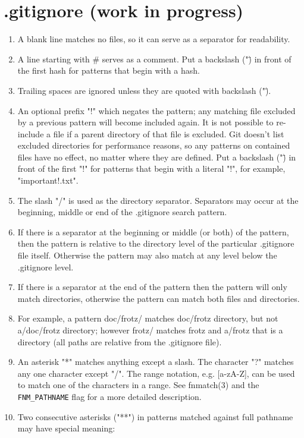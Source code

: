 \documentclass{charun}
\begin{document}
\section{.gitignore (work in progress)}
\begin{enumerate}
\item A blank line matches no files, so it can serve as a separator for readability.
\item A line starting with \# serves as a comment. Put a backslash ("\") in front of the first hash for patterns that begin with a hash.
\item Trailing spaces are ignored unless they are quoted with backslash ("\").
\item An optional prefix "!" which negates the pattern; any matching file excluded by a previous pattern will become included again. It is not possible to re-include a file if a parent directory of that file is excluded. Git doesn’t list excluded directories for performance reasons, so any patterns on contained files have no effect, no matter where they are defined. Put a backslash ("\") in front of the first "!" for patterns that begin with a literal "!", for example, "\!important!.txt".
\item The slash "/" is used as the directory separator. Separators may occur at the beginning, middle or end of the .gitignore search pattern.
\item If there is a separator at the beginning or middle (or both) of the pattern, then the pattern is relative to the directory level of the particular .gitignore file itself. Otherwise the pattern may also match at any level below the .gitignore level.
\item If there is a separator at the end of the pattern then the pattern will only match directories, otherwise the pattern can match both files and directories.
\item For example, a pattern doc/frotz/ matches doc/frotz directory, but not a/doc/frotz directory; however frotz/ matches frotz and a/frotz that is a directory (all paths are relative from the .gitignore file).
\item An asterisk "*" matches anything except a slash. The character "?" matches any one character except "/". The range notation, e.g. [a-zA-Z], can be used to match one of the characters in a range. See fnmatch(3) and the \texttt{FNM_PATHNAME} flag for a more detailed description.
\item Two consecutive asterisks ("**") in patterns matched against full pathname may have special meaning:

\end{enumerate}
\end{document}
